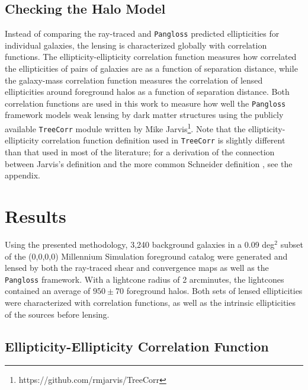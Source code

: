 \documentclass[%
 reprint,
 amsmath,amssymb,
 aps,nofootinbib
]{revtex4-1}
\begin{document}
\subsection*{Checking the Halo Model}

Instead of comparing the ray-traced and \texttt{Pangloss} predicted ellipticities for individual galaxies, the lensing is characterized globally with correlation functions. The ellipticity-ellipticity correlation function measures how correlated the ellipticities of pairs of galaxies are as a function of separation distance, while the galaxy-mass correlation function measures the correlation of lensed ellipticities around foreground halos as a function of separation distance. Both correlation functions are used in this work to measure how well the \texttt{Pangloss} framework models weak lensing by dark matter structures using the publicly available \texttt{TreeCorr} module written by Mike Jarvis\footnote{https://github.com/rmjarvis/TreeCorr}. Note that the ellipticity-ellipticity correlation function definition used in \texttt{TreeCorr} is slightly different than that used in most of the literature; for a derivation of the connection between Jarvis's definition and the more common Schneider definition \cite{schneider}, see the appendix.

\section{Results}

Using the presented methodology, 3,240 background galaxies in a 0.09 deg$^2$ subset of the (0,0,0,0) Millennium Simulation foreground catalog were generated and lensed by both the ray-traced shear and convergence maps as well as the \texttt{Pangloss} framework. With a lightcone radius of 2 arcminutes, the lightcones contained an average of ${950\pm70}$ foreground halos. Both sets of lensed ellipticities were characterized with correlation functions, as well as the intrinsic ellipticities of the sources before lensing.

\subsection*{Ellipticity-Ellipticity Correlation Function}
\end{document}
